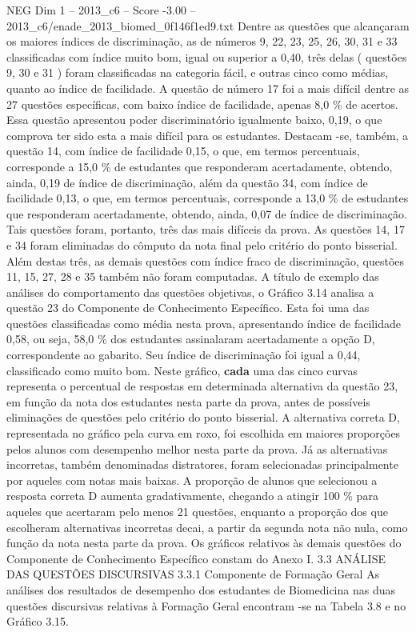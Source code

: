 \begin{textsample}{NEG Dim 1 – 2013\_c6 – Score -3.00 – 2013\_c6/enade\_2013\_biomed\_0f146f1ed9.txt}
Dentre as questões que alcançaram os maiores índices de discriminação, as de números 9, 22, 23, 25, 26, 30, 31 e 33 classificadas com índice muito bom, igual ou superior a 0,40, três delas ( questões 9, 30 e 31 ) foram classificadas na categoria fácil, e outras cinco como médias, quanto ao índice de facilidade.
A questão de número 17 foi a mais difícil dentre as 27 questões específicas, com baixo índice de facilidade, apenas 8,0 \% de acertos.
Essa questão apresentou poder discriminatório igualmente baixo, 0,19, o que comprova ter sido esta a mais difícil para os estudantes.
Destacam -se, também, a questão 14, com índice de facilidade 0,15, o que, em termos percentuais, corresponde a 15,0 \% de estudantes que responderam acertadamente, obtendo, ainda, 0,19 de índice de discriminação, além da questão 34, com índice de facilidade 0,13, o que, em termos percentuais, corresponde a 13,0 \% de estudantes que responderam acertadamente, obtendo, ainda, 0,07 de índice de discriminação.
Tais questões foram, portanto, três das mais difíceis da prova.
As questões 14, 17 e 34 foram eliminadas do cômputo da nota final pelo critério do ponto bisserial.
Além destas três, as demais questões com índice fraco de discriminação, questões 11, 15, 27, 28 e 35 também não foram computadas.
A título de exemplo das análises do comportamento das questões objetivas, o Gráfico 3.14 analisa a questão 23 do Componente de Conhecimento Específico.
Esta foi uma das questões classificadas como média nesta prova, apresentando índice de facilidade 0,58, ou seja, 58,0 \% dos estudantes assinalaram acertadamente a opção D, correspondente ao gabarito.
Seu índice de discriminação foi igual a 0,44, classificado como muito bom.
Neste gráfico, \textbf{cada} uma das cinco curvas representa o percentual de respostas em determinada alternativa da questão 23, em função da nota dos estudantes nesta parte da prova, antes de possíveis eliminações de questões pelo critério do ponto bisserial.
A alternativa correta D, representada no gráfico pela curva em roxo, foi escolhida em maiores proporções pelos alunos com desempenho melhor nesta parte da prova.
Já as alternativas incorretas, também denominadas distratores, foram selecionadas principalmente por aqueles com notas mais baixas.
A proporção de alunos que selecionou a resposta correta D aumenta gradativamente, chegando a atingir 100 \% para aqueles que acertaram pelo menos 21 questões, enquanto a proporção dos que escolheram alternativas incorretas decai, a partir da segunda nota não nula, como função da nota nesta parte da prova.
Os gráficos relativos às demais questões do Componente de Conhecimento Específico constam do Anexo I. 3.3 ANÁLISE DAS QUESTÕES DISCURSIVAS 3.3.1 Componente de Formação Geral As análises dos resultados de desempenho dos estudantes de Biomedicina nas duas questões discursivas relativas à Formação Geral encontram -se na Tabela 3.8 e no Gráfico 3.15.

\end{textsample}
